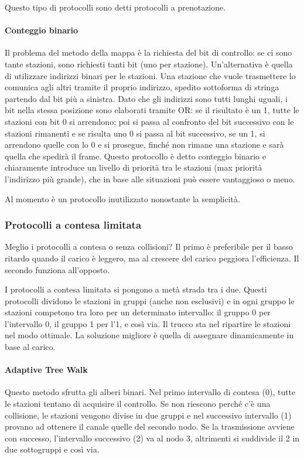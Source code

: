 Questo tipo di protocolli sono detti protocolli a prenotazione.

\paragraph{Conteggio binario}
Il problema del metodo della mappa è la richiesta del bit di controllo: se ci sono tante stazioni, sono richiesti tanti bit (uno per stazione).
Un'alternativa è quella di utilizzare indirizzi binari per le stazioni.
Una stazione che vuole trasmettere lo comunica agli altri tramite il proprio indirizzo, spedito sottoforma di stringa partendo dal bit più a sinistra.
Dato che gli indirizzi sono tutti lunghi uguali, i bit nella stessa posizione sono elaborati tramite OR: 
se il risultato è un 1, tutte le stazioni con bit 0 si arrendono;
poi si passa al confronto del bit successivo con le stazioni rimanenti e se risulta uno 0 si passa al bit successivo,
se un 1, si arrendono quelle con lo 0 e si prosegue, finché non rimane una stazione e sarà quella che spedirà il frame.
Questo protocollo è detto conteggio binario e chiaramente introduce un livello di priorità tra le stazioni (max priorità l'indirizzo più grande),
che in base alle situazioni può essere vantaggioso o meno.

Al momento è un protocollo inutilizzato nonostante la semplicità.

\subsubsection{Protocolli a contesa limitata}
Meglio i protocolli a contesa o senza collisioni?
Il primo è preferibile per il basso ritardo quando il carico è leggero, ma al crescere del carico peggiora l'efficienza.
Il secondo funziona all'opposto.

I protocolli a contesa limitata si pongono a metà strada tra i due.
Questi protocolli dividono le stazioni in gruppi (anche non esclusivi) e in ogni gruppo le stazioni competono tra loro per un determinato intervallo:
il gruppo 0 per l'intervallo 0, il gruppo 1 per l'1, e così via.
Il trucco sta nel ripartire le stazioni nel modo ottimale.
La soluzione migliore è quella di assegnare dinamicamente in base al carico.

\paragraph{Adaptive Tree Walk}
Questo metodo sfrutta gli alberi binari.
Nel primo intervallo di contesa (0), tutte le stazioni tentano di acquisire il controllo. 
Se non riescono perché c'è una collisione, le stazioni vengono divise in due gruppi e 
nel successivo intervallo (1) provano ad ottenere il canale quelle del secondo nodo.
Se la trasmissione avviene con successo, l'intervallo successivo (2) va al nodo 3, altrimenti si suddivide il 2 in due sottogruppi e così via.

